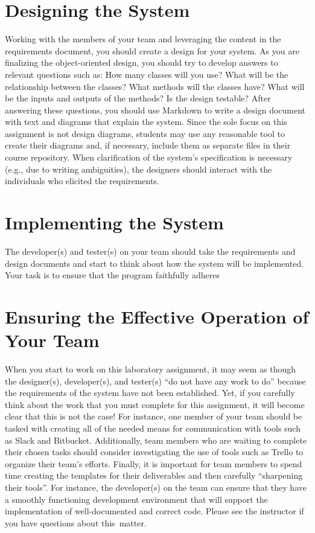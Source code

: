\section*{Designing the System}

Working with the members of your team and leveraging the content in the requirements document, you should create a
design for your system.  As you are finalizing the object-oriented design, you should try to develop answers to relevant
questions such as: How many classes will you use? What will be the relationship between the classes? What methods will
the classes have? What will be the inputs and outputs of the methods?  Is the design testable?  After answering these
questions, you should use Markdown to write a design document with text and diagrams that explain the system. Since the
sole focus on this assignment is not design diagrams, students may use any reasonable tool to create their diagrams and,
if necessary, include them as separate files in their course repository. When clarification of the system's
specification is necessary (e.g., due to writing ambiguities), the designers should interact with the individuals who
elicited the requirements.

\section*{Implementing the System}

The developer(s) and tester(s) on your team should take the requirements and design documents and start to think about
how the system will be implemented. Your task is to ensure that the program faithfully adheres

\section*{Ensuring the Effective Operation of Your Team}

When you start to work on this laboratory assignment, it may seem as though the designer(s), developer(s), and tester(s)
``do not have any work to do'' because the requirements of the system have not been established. Yet, if you carefully
think about the work that you must complete for this assignment, it will become clear that this is not the case! For
instance, one member of your team should be tasked with creating all of the needed means for communication with tools
such as Slack and Bitbucket. Additionally, team members who are waiting to complete their chosen tasks should consider
investigating the use of tools such as Trello to organize their team's efforts. Finally, it is important for team
members to spend time creating the templates for their deliverables and then carefully ``sharpening their tools''. For
instance, the developer(s) on the team can ensure that they have a smoothly functioning development environment that
will support the implementation of well-documented and correct code. Please see the instructor if you have questions
about \mbox{this matter}.

